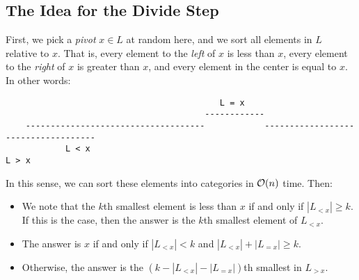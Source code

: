 \documentclass[letterpaper]{article}
\begin{document}
\subsection{The Idea for the Divide Step}
First, we pick a \emph{pivot} $x \in L$ at random here, and we sort all elements in $L$ relative to $x$. That is, every element to the \emph{left} of $x$ is less than $x$, every element to the \emph{right} of $x$ is greater than $x$, and every element in the center is equal to $x$. In other words: 
\begin{verbatim}
                                           L = x
                                        ------------
    ------------------------------------            ------------------------------------
            L < x                                                         L > x
\end{verbatim}
In this sense, we can sort these elements into categories in $\mathcal{O}(n)$ time. Then: 
\begin{itemize}
    \item We note that the $k$th smallest element is less than $x$ if and only if $|L_{< x}| \geq k$. If this is the case, then the answer is the $k$th smallest element of $L_{< x}$. 
    \item The answer is $x$ if and only if $|L_{< x}| < k$ and $|L_{< x}| + |L_{= x}| \geq k$.
    \item Otherwise, the answer is the $(k - |L_{< x}| - |L_{= x}|)$th smallest in $L_{> x}$. 
\end{itemize}
\end{document}
